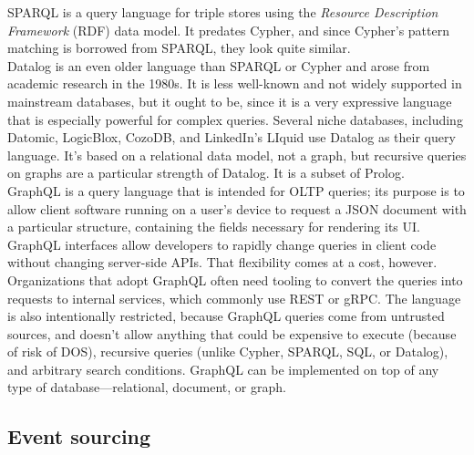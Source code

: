 \documentclass[table, xcdraw]{article}%
\begin{document}
\begin{itemize}
    SPARQL is a query language for triple stores using the \textit{Resource Description Framework} (RDF) data model. It predates Cypher, and since Cypher’s pattern matching is borrowed from SPARQL, they look quite similar.\\
    Datalog is an even older language than SPARQL or Cypher and arose from academic research in the 1980s. It is less well-known and not widely supported in mainstream databases, but it ought to be, since it is a very expressive language that is especially powerful for complex queries. Several niche databases, including Datomic, LogicBlox, CozoDB, and LinkedIn’s LIquid use Datalog as their query language. It’s based on a relational data model, not a graph, but recursive queries on graphs are a particular strength of Datalog. It is a subset of Prolog.\\
    GraphQL is a query language that is intended for OLTP queries; its purpose is to allow client software running on a user’s device to request a JSON document with a particular structure, containing the fields necessary for rendering its UI. GraphQL interfaces allow developers to rapidly change queries in client code without changing server-side APIs. That flexibility comes at a cost, however. Organizations that adopt GraphQL often need tooling to convert the queries into requests to internal services, which commonly use REST or gRPC. The language is also intentionally restricted, because GraphQL queries come from untrusted sources, and doesn't allow anything that could be expensive to execute (because of risk of DOS), recursive queries (unlike Cypher, SPARQL, SQL, or Datalog), and arbitrary search conditions. GraphQL can be implemented on top of any type of database—relational, document, or graph.
\end{itemize}

\subsection{Event sourcing}
\end{document}
